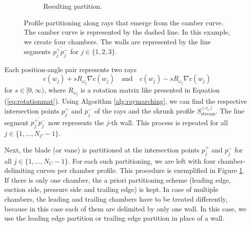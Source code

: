 \documentclass[a4paper, 11pt]{report}
\theoremstyle{definition}
\begin{document}
\begin{figure}[H]
\begin{subfigure}{.33\textwidth}
			\vspace{2cm}
			\caption{Resulting partition.}
		\end{subfigure}
		\caption{Profile partitioning along rays that emerge from the camber curve. The camber curve is represented by the dashed line. In this example, we create four chambers. The walls are represented by the line segments $\overline{p_j^+p_j^-}$ for $j \in \{1, 2, 3\}$.}
		\label{fig:subdivision_chamber}
	\end{figure}

	Each position-angle pair represents two rays
		$$ c(w_j) + sR_{\omega_j} \nabla c(w_j) \quad\text{and}\quad c(w_j) - sR_{\omega_j} \nabla c(w_j) $$
	for $s \in [0, \infty)$, where $R_{\omega_j}$ is a rotation matrix like presented in Equation (\ref{eq:rotationmat}). Using Algorithm \ref{alg:raymarching}, we can find the respective intersection points $p_j^+$ and $p_j^-$ of the rays and the shrunk profile $S^{(v_i)}_\textrm{stream}$. The line segment $\overline{p_j^+p_j^-}$ now represents the $j$-th wall. This process is repeated for all $j \in \{1,...,N_C-1\}$.

	Next, the blade (or vane) is partitioned at the intersection points $p_j^+$ and $p_j^-$ for all $j \in \{1,...,N_C-1\}$. For each such partitioning, we are left with four chamber-delimiting curves per chamber profile. This procedure is exemplified in Figure \ref{fig:subdivision_chamber}. If there is only one chamber, the a priori partitioning scheme (leading edge, suction side, pressure side and trailing edge) is kept. In case of multiple chambers, the leading and trailing chambers have to be treated differently, because in this case each of them are delimited by only one wall. In this case, we use the leading edge partition or trailing edge partition in place of a wall.
\end{document}
